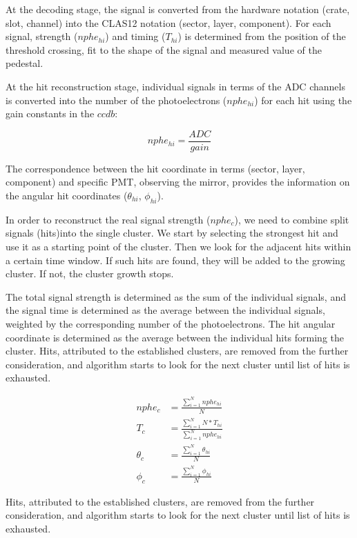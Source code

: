 \documentclass[3p,times,twocolumn]{elsarticle}
\begin{document}
At the decoding stage, the signal is converted from the hardware notation (crate, slot, channel) into the CLAS12
notation (sector, layer, component).  For each signal, strength ($nphe_{hi}$) and timing ($T_{hi}$) is determined
from the position of the threshold crossing, fit to the shape of the signal and measured value of the pedestal.

At the hit reconstruction stage, individual signals in terms of the ADC channels is converted into the number of
the photoelectrons ($nphe_{hi}$) for each hit using the gain constants in the $ccdb$:

\begin{equation}
nphe_{hi} = \frac{ADC}{gain}
\end{equation}

The correspondence between the  hit coordinate in terms (sector, layer, component) and specific PMT, observing
the mirror,  provides the information on the angular hit coordinates ($\theta_{hi}$, $\phi_{hi}$).

In order to reconstruct the real signal strength ($nphe_c$), we need to combine split signals (hits)into the single
cluster. We start by selecting the strongest hit and use it as a starting point of the cluster. Then we look for the
adjacent hits within a certain time window.  If such hits are found, they will be added to the growing cluster. If
not, the cluster growth stops.

The total signal strength is determined as the sum of the individual signals, and the signal time is determined as
the average between the individual signals, weighted by the corresponding number of the photoelectrons. The hit
angular coordinate is determined as the average between the individual hits forming the cluster.  Hits, attributed
to the established clusters, are removed from the further consideration, and algorithm starts to look for the next
cluster until list of hits is exhausted.

\begin{eqnarray*}
nphe_c &= \frac{\sum_{i=1}^{N}{nphe_{hi}}}{N}\\
T_c &= \frac{\sum_{i=1}^{N}{N*T_{hi}}}{\sum_{i=1}^{N}{nphe_{hi}}}\\
\theta_c &=\frac{\sum_{i=1}^{N}{\theta_{hi}}}{N}\\
\phi_c &= \frac{\sum_{i=1}^{N}{\phi_{hi}}}{N}
\end{eqnarray*}

Hits, attributed to the established clusters, are removed from the further consideration, and algorithm starts to
look for the next cluster until list of hits is exhausted.
\end{document}
